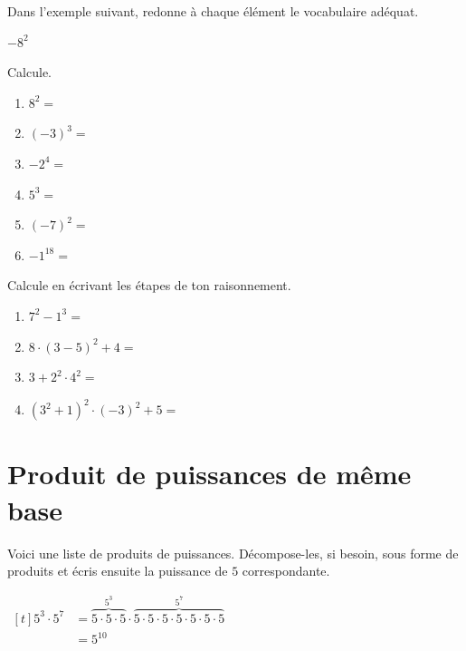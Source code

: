 \documentclass[../math2.tex]{subfiles}
\begin{document}
\begin{exercise}
	Dans l'exemple suivant, redonne à chaque élément le vocabulaire adéquat. 
	\vspace*{1cm}
	\begin{center}
		$-8^2$
	\end{center}
\end{exercise}
\vspace*{1cm}
\begin{exercise}
	Calcule.
	\begin{enumerate}[cols=3]
		\item  $8^2=$
		\item $(-3)^3=$
		\item $-2^4=$
		\item $5^3=$
		\item $\left(-7\right)^2=$
		\item $-1^{18}=$
	\end{enumerate}
\end{exercise}
\begin{exercise}
	Calcule en écrivant les étapes de ton raisonnement.
	\begin{enumerate}[cols=2, itemsep=4cm]
		\item $7^2 - 1^3=$
		\item $8\cdot(3-5)^2+4=$
		\item $3+2^2\cdot4^2=$
		\item $\left( 3^2 + 1 \right)^2 \cdot (-3)^2 + 5=$
	\end{enumerate}
\end{exercise}

\newpage
\section{Produit de puissances de même base}
Voici une liste de produits de puissances. Décompose-les, si besoin, sous forme de produits et écris ensuite la puissance de $5$ correspondante.

\exemple
$\begin{aligned}[t]
		5^3 \cdot 5^7 & = \overbrace{5 \cdot 5 \cdot 5}^{5^3} \cdot \overbrace{5 \cdot 5 \cdot 5 \cdot 5 \cdot 5 \cdot 5 \cdot 5}^{5^7} \\
		              & = 5^{10}
	\end{aligned}$
\end{document}
